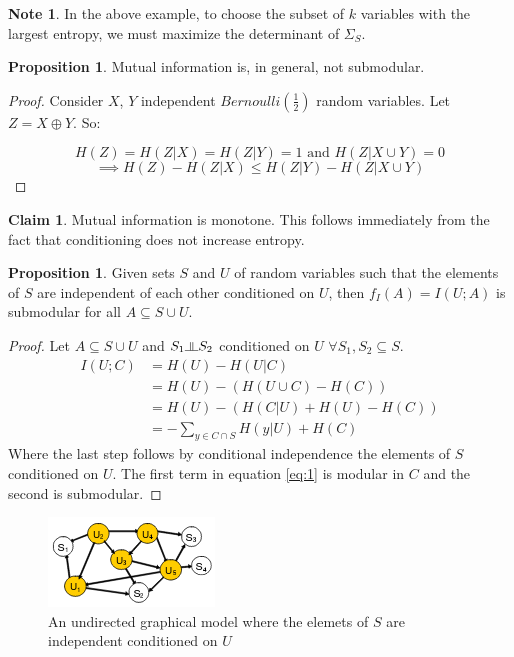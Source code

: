 \documentclass[twoside]{article}
\newcommand*\xor{\mathbin{\oplus}}
\newcommand{\indep}{\rotatebox[origin=c]{90}{$\models$}}
\theoremstyle{definition}
\newtheorem{proposition}[theorem]{Proposition}
\newtheorem{claim}[theorem]{Claim}
\newtheorem{note}[theorem]{Note}
\begin{document}
\begin{note}
  In the above example, to choose the subset of $k$ variables with the
  largest entropy, we must maximize the determinant of $\Sigma_S$.
\end{note}

\begin{proposition}
  Mutual information is, in general, not submodular.
\end{proposition}
\begin{proof}
  Consider $X$, $Y$
  independent $Bernoulli(\frac{1}{2})$ random variables. Let $Z = X
  \xor Y$. So:

  $$H(Z) = H (Z | X) = H (Z | Y) = 1  \text{ and } H (Z | X \cup Y) = 0$$
  $$\implies H(Z) - H(Z | X) \leq H (Z | Y) - H (Z | X \cup Y)$$
\end{proof}

\begin{claim}
  Mutual information is monotone. This follows immediately from
  the fact that conditioning does not increase entropy.
\end{claim}

\begin{proposition}
  Given sets $S$ and $U$ of random variables such that the elements of
  $S$ are independent of each other conditioned on $U$, then $f_I(A) = I(U;
  A)$
  is submodular for all $A \subseteq S \cup U$.
\end{proposition}

\begin{proof}
  Let $A \subseteq S \cup U$ and $S_1 \indep S_2$ conditioned on
  $U$ $ \forall S_1, S_2 \subseteq S$.
  \begin{align} \label{eq:1}
    I(U; C) &= H(U) - H(U | C) \nonumber\\
            &= H(U) - (H(U \cup C) - H(C)) \nonumber\\
            &= H(U) - (H(C | U) + H(U) - H(C)) \nonumber\\
            &= -\sum_{y \in C \cap S} H(y | U) + H(C)
  \end{align}
  Where the last step follows by conditional independence the elements
  of $S$ conditioned on $U$. The first term in equation \ref{eq:1} is
  modular in $C$ and the second is submodular.
\end{proof}

\begin{figure}[h]
  \centering
  \includegraphics[scale=0.8]{cond_ind.png}
  \caption{An undirected graphical model where the elemets of $S$ are
    independent conditioned on $U$}
  \label{fig:ugm}
\end{figure}
\end{document}
